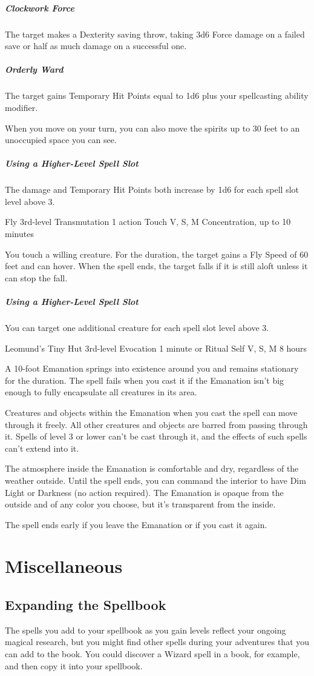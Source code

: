 \documentclass[letterpaper,openany,oneside,twocolumn]{book}
\begin{document}
\subparagraph*{Clockwork Force} The target makes a Dexterity saving throw, taking 3d6 Force damage on a failed save or half as much damage on a successful one.
\subparagraph*{Orderly Ward} The target gains Temporary Hit Points equal to 1d6 plus your spellcasting ability modifier.

When you move on your turn, you can also move the spirits up to 30 feet to an unoccupied space you can see.

\subparagraph*{Using a Higher-Level Spell Slot} The damage and Temporary Hit Points both increase by 1d6 for each spell slot level above 3.

\DndSpellHeader
  {Fly}
  {3rd-level Transmutation }
  {1 action}
  {Touch}
  {V, S, M}
  {Concentration, up to 10 minutes}

You touch a willing creature. For the duration, the target gains a Fly Speed of 60 feet and can hover. When the spell ends, the target falls if it is still aloft unless it can stop the fall.

\subparagraph*{Using a Higher-Level Spell Slot} You can target one additional creature for each spell slot level above 3.

\DndSpellHeader
  {Leomund's Tiny Hut}
  {3rd-level Evocation }
  {1 minute or Ritual}
  {Self}
  {V, S, M}
  {8 hours}

A 10-foot Emanation springs into existence around you and remains stationary for the duration. The spell fails when you cast it if the Emanation isn't big enough to fully encapsulate all creatures in its area.

Creatures and objects within the Emanation when you cast the spell can move through it freely. All other creatures and objects are barred from passing through it. Spells of level 3 or lower can't be cast through it, and the effects of such spells can't extend into it.

The atmosphere inside the Emanation is comfortable and dry, regardless of the weather outside. Until the spell ends, you can command the interior to have Dim Light or Darkness (no action required). The Emanation is opaque from the outside and of any color you choose, but it's transparent from the inside.

The spell ends early if you leave the Emanation or if you cast it again.

\section*{Miscellaneous}
\subsection*{Expanding the Spellbook}
The spells you add to your spellbook as you gain levels reflect your ongoing magical research, but you might find other spells during your adventures that you can add to the book. You could discover a Wizard spell in a book, for example, and then copy it into your spellbook.
\end{document}
